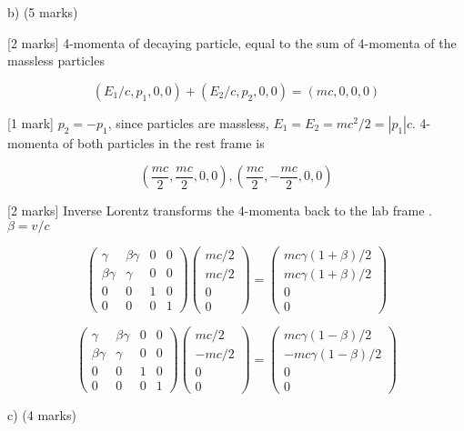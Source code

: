 \documentclass[a4paper,11pt]{article}
\begin{document}
b) (5 marks)

[2 marks] 4-momenta of decaying particle, equal to the sum of 4-momenta of the massless particles 

\[ (E_1 / c, p_1, 0, 0) + (E_2 / c, p_2, 0, 0) = (mc, 0, 0, 0) \]

[1 mark] \( p_2 =  - p_1 \), since particles are massless, \( E_1 = E_2 = mc^2 / 2 = |p_1|c \). 4-momenta of both particles in the rest frame is

\[ \left( \frac{mc}{2}, \frac{mc}{2}, 0, 0 \right), \left( \frac{mc}{2}, -\frac{mc}{2}, 0, 0 \right) \]


[2 marks] Inverse Lorentz transforms the 4-momenta back to the lab frame . \( \beta = v / c \)

\[
\begin{pmatrix} \gamma & \beta \gamma & 0 & 0 \\ \beta \gamma & \gamma & 0 & 0 \\ 0 & 0 & 1 & 0 \\ 0 & 0 & 0 & 1 \end{pmatrix} \begin{pmatrix} mc/2\\ mc/2\\ 0\\ 0 \end{pmatrix} = \begin{pmatrix} mc \gamma (1+\beta) /2\\ mc \gamma (1+\beta) /2\\ 0\\ 0 \end{pmatrix}
\]

\[
\begin{pmatrix} \gamma & \beta \gamma & 0 & 0 \\ \beta \gamma & \gamma & 0 & 0 \\ 0 & 0 & 1 & 0 \\ 0 & 0 & 0 & 1 \end{pmatrix} \begin{pmatrix} mc/2\\ -mc/2\\ 0\\ 0 \end{pmatrix} = \begin{pmatrix} mc \gamma (1-\beta) /2\\ -mc \gamma (1-\beta) /2\\ 0\\ 0 \end{pmatrix}
\]


c) (4 marks)
\end{document}
